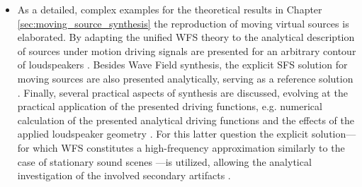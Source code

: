 \begin{itemize}
%
\item As a detailed, complex examples for the theoretical results in Chapter \ref{sec:moving_source_synthesis} the reproduction of moving virtual sources is elaborated.
By adapting the unified WFS theory to the analytical description of sources under motion driving signals are presented for an arbitrary contour of loudspeakers \cite{Firtha2015:daga, firtha2016wave, doi:10.1121/1.4996126}.
Besides Wave Field synthesis, the explicit SFS solution for moving sources are also presented analytically, serving as a reference solution \cite{Firtha2014:daga, Firtha2014:isma}.
Finally, several practical aspects of synthesis are discussed, evolving at the practical application of the presented driving functions, e.g. numerical calculation of the presented analytical driving functions and the effects of the applied loudspeaker geometry \cite{Firtha2018_daga_a}.
For this latter question the explicit solution---for which WFS constitutes a high-frequency approximation similarly to the case of stationary sound scenes \cite{firtha2015sound}---is utilized, allowing the analytical investigation of the involved secondary artifacts \cite{firtha2016:daga}.
\end{itemize}
